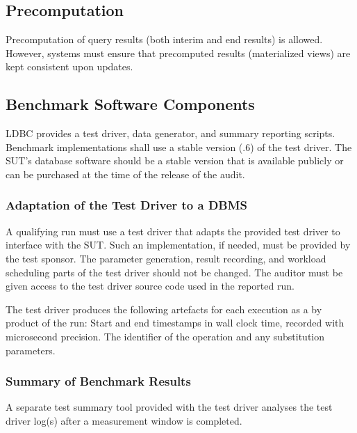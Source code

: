 \subsection{Precomputation}

Precomputation of query results (both interim and end results) is allowed. However, systems must ensure that precomputed results (\eg materialized views) are kept consistent upon updates.

\subsection{Benchmark Software Components}
\label{sec:snb-software-components}
LDBC provides a test driver, data generator, and summary reporting scripts. Benchmark implementations shall use a stable version (.6) of the test driver. The SUT's database software should be a stable version that is available publicly or can be purchased at the time of the release of the audit.

\subsubsection{Adaptation of the Test Driver to a DBMS}
\label{sec:test-driver}
A qualifying run must use a test driver that adapts the provided test driver to interface with the SUT. Such an implementation, if needed, must be provided by the test sponsor. The parameter generation, result recording, and workload scheduling parts of the test driver should not be changed. The auditor must be given access to the test driver source code used in the reported run.

The test driver produces the following artefacts for each execution as a by product of the run: Start and end timestamps in wall clock time, recorded with microsecond precision. The identifier of the operation and any substitution parameters.


\subsubsection{Summary of Benchmark Results}
\label{sec:performance-metrics}
A separate test summary tool provided with the test driver analyses the test driver log(s) after a measurement window is completed. 

